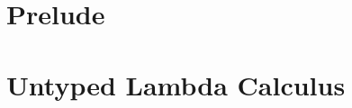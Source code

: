 \documentclass{scrbook}
\begin{document}
\tableofcontents
\newpage


\part{Prelude}


\part{Untyped Lambda Calculus}




\newpage
\listoftodos
\end{document}
